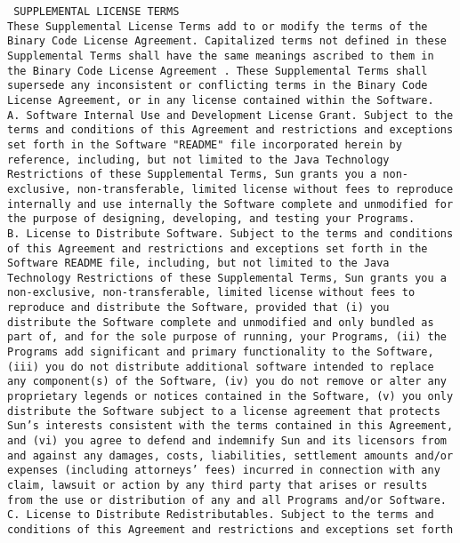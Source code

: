 \setlength{\baselineskip}{0.5\oldbaselineskip}
{\tiny\tt
\noindent
SUPPLEMENTAL LICENSE TERMS
\\[4pt]
These Supplemental License Terms add to or modify the terms of the
Binary Code License Agreement. Capitalized terms not defined in these
Supplemental Terms shall have the same meanings ascribed to them in
the Binary Code License Agreement . These Supplemental Terms shall
supersede any inconsistent or conflicting terms in the Binary Code
License Agreement, or in any license contained within the Software.
\\[4pt]
A. Software Internal Use and Development License Grant.  Subject to
the terms and conditions of this Agreement and restrictions and
exceptions set forth in the Software "README" file incorporated herein
by reference, including, but not limited to the Java Technology
Restrictions of these Supplemental Terms, Sun grants you a
non-exclusive, non-transferable, limited license without fees to
reproduce internally and use internally the Software complete and
unmodified for the purpose of designing, developing, and testing your
Programs.
\\[4pt]
B. License to Distribute Software. Subject to the terms and conditions
of this Agreement and restrictions and exceptions set forth in the
Software README file, including, but not limited to the Java
Technology Restrictions of these Supplemental Terms, Sun grants you a
non-exclusive, non-transferable, limited license without fees to
reproduce and distribute the Software, provided that (i) you
distribute the Software complete and unmodified and only bundled as
part of, and for the sole purpose of running, your Programs, (ii) the
Programs add significant and primary functionality to the Software,
(iii) you do not distribute additional software intended to replace
any component(s) of the Software, (iv) you do not remove or alter any
proprietary legends or notices contained in the Software, (v) you only
distribute the Software subject to a license agreement that protects
Sun's interests consistent with the terms contained in this Agreement,
and (vi) you agree to defend and indemnify Sun and its licensors from
and against any damages, costs, liabilities, settlement amounts and/or
expenses (including attorneys' fees) incurred in connection with any
claim, lawsuit or action by any third party that arises or results
from the use or distribution of any and all Programs and/or Software.
\\[4pt]
C. License to Distribute Redistributables. Subject to the terms and
conditions of this Agreement and restrictions and exceptions set forth
}
